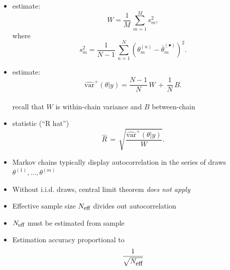 \documentclass[10pt]{report}
\begin{document}
\begin{itemize}
\item {} estimate:
\[\textstyle
W 
= \frac{1}{M} \, \sum_{m=1}^M s_m^2,
\]
where
\[\textstyle
s_m^2 = \frac{1}{N-1} \, \sum_{n=1}^N (\theta^{(n)}_m - \bar{\theta}^{(\bullet)}_m)^2.
\]
\end{itemize}

\begin{itemize}
\item {} estimate:
\[\textstyle
\widehat{\mbox{var}}^{+}\!(\theta|y)
= \frac{N-1}{N}\, W \, + \, \frac{1}{N} \, B.
\]
\\[4pt]
recall that $W$ is within-chain variance and $B$ between-chain
%
\vspace*{6pt}
\item {} statistic (``R hat'')
\[\textstyle
\hat{R} 
\, = \,
\sqrt{\frac{\widehat{\mbox{var}}^{+}\!(\theta|y)}{W}}.
\]
\end{itemize}


%
\begin{itemize}
\item Markov chains typically display autocorrelation in the series of
  draws $\theta^{(1)}, \ldots, \theta^{(m)}$
\item Without i.i.d. draws, central limit theorem \emph{does not apply}
\item Effective sample size $N_{\mbox{\footnotesize eff}}$ divides out
  autocorrelation
\item $N_{\mbox{\footnotesize eff}}$ must be estimated from sample
\vspace*{-6pt}
\item Estimation accuracy proportional to 
{\large
\[
\frac{1}{\sqrt{N_{\mbox{\small eff}}}}
\]
}
\end{itemize}
\end{document}
